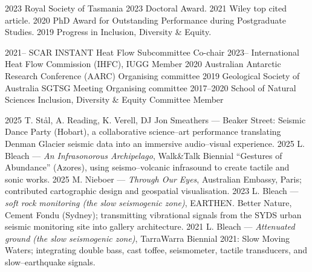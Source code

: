 \documentclass[11pt, a4paper]{cvClass}
\begin{document}
\begin{cvhonors}
  \cvhonor
    {2023}
    {Royal Society of Tasmania 2023 Doctoral Award.}
    {}
    {}
  \cvhonor
    {2021}
    {Wiley top cited article.}
    {}
    {}
  \cvhonor
    {2020}
    {PhD Award for Outstanding Performance during Postgraduate Studies.}
    {}
    {}
  \cvhonor
    {2019}
    {Progress in Inclusion, Diversity \& Equity.}
    {}
    {}
\end{cvhonors}


\begin{cvhonors}
  \cvhonor
    {2021--}
    {SCAR INSTANT Heat Flow Subcommittee}
    {Co-chair}
    {}
  \cvhonor
    {2023--}
    {International Heat Flow Commission (IHFC), IUGG}
    {Member}
    {}
  \cvhonor
    {2020}
    {Australian Antarctic Research Conference (AARC)}
    {Organising committee}
    {}
  \cvhonor
    {2019}
    {Geological Society of Australia SGTSG Meeting}
    {Organising committee}
    {}
  \cvhonor
    {2017--2020}
    {School of Natural Sciences Inclusion, Diversity \& Equity Committee}
    {Member}
    {}
\end{cvhonors}


\begin{cvhonors}
  \cvhonor
    {2025}
    {T. Stål, A. Reading, K. Verell, DJ Jon Smeathers — Beaker Street: Seismic Dance Party (Hobart), a collaborative science–art performance translating Denman Glacier seismic data into an immersive audio–visual experience.}
    {}
    {}
  \cvhonor
    {2025}
    {L. Bleach — \textit{An Infrasonorous Archipelago}, Walk\&Talk Biennial “Gestures of Abundance” (Azores), using seismo–volcanic infrasound to create tactile and sonic works.}
    {}
    {}
  \cvhonor
    {2025}
    {M. Nieboer — \textit{Through Our Eyes}, Australian Embassy, Paris; contributed cartographic design and geospatial visualisation.}
    {}
    {}
  \cvhonor
    {2023}
    {L. Bleach — \textit{soft rock monitoring (the slow seismogenic zone)}, EARTHEN. Better Nature, Cement Fondu (Sydney); transmitting vibrational signals from the SYDS urban seismic monitoring site into gallery architecture.}
    {}
    {}
  \cvhonor
    {2021}
    {L. Bleach — \textit{Attenuated ground (the slow seismogenic zone)}, TarraWarra Biennial 2021: Slow Moving Waters; integrating double bass, cast toffee, seismometer, tactile transducers, and slow–earthquake signals.}
    {}
    {}
\end{cvhonors}
\end{document}
